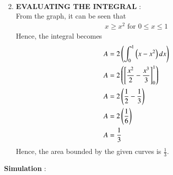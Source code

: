 \documentclass[journal]{IEEEtran}
\begin{document}
\begin{enumerate}
\begin{align}
		\end{align}
	\item \textbf{EVALUATING THE INTEGRAL } : \\
	From the graph, it can be seen that 
	\begin{align}
		x \geq x^2 \text{ for } 0 \leq x \leq 1
	\end{align}
	Hence, the integral becomes
	\begin{align}
		A &= 2 \left( \int_{0}^{1} \left(x - x^2\right) dx \right)\\
		A &= 2 \left( \left[ \frac{x^2}{2} - \frac{x^3}{3} \right]_{0}^{1} \right) \\
		A &= 2 \left( \frac{1}{2} - \frac{1}{3} \right)\\
		A &= 2 \left( \frac{1}{6} \right) \\
		A &= \frac{1}{3}
	\end{align}
	Hence, the area bounded by the given curves is $\frac{1}{3}$. \\
\end{enumerate}
\textbf{Simulation } : 
\end{document}
